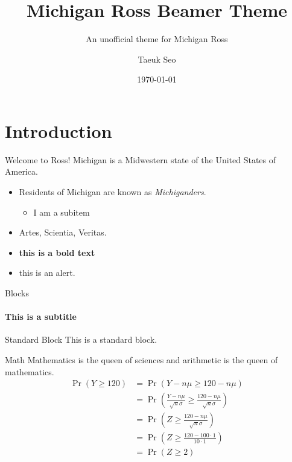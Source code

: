 \documentclass[aspectratio=169]{beamer}
\author{Taeuk Seo}
\title{Michigan Ross Beamer Theme}
\subtitle{An unofficial theme for Michigan Ross}
\institute{Stephen M. Ross School of Business, University of Michigan}
\date{\today}
\begin{document}
\begin{frame}[plain]
	\titlepage
\end{frame}

\section{Introduction}
	
\begin{frame}{Welcome to Ross!}
	Michigan is a Midwestern state of the United States of America. 
	\vfill
	\begin{itemize}
		\item Residents of Michigan are known as \emph{Michiganders}.
		\begin{itemize}
			\item I am a subitem
		\end{itemize}
		\item Artes, Scientia, Veritas.
		\item \textbf{this is a bold text}
		\item \alert{this is an alert}.
	\end{itemize}
\end{frame}

\begin{frame}{Blocks}
	\framesubtitle{This is a subtitle}
	\begin{block}{Standard Block}
		This is a standard block.
	\end{block}
\end{frame}

\begin{frame}{Math}
	Mathematics is the queen of sciences and arithmetic is the queen of mathematics.
	\begin{align*}
		\Pr(Y \geq 120) &= \Pr\left(Y-n\mu \geq 120-n\mu \right)\\
		&= \Pr\left( \frac{Y-n\mu }{\sqrt{n}\sigma} \geq \frac{120-n\mu }{\sqrt{n}\sigma} \right)\\
		&=\Pr\left( Z \geq \frac{120-n\mu }{\sqrt{n}\sigma} \right)\\
		&=\Pr\left( Z \geq \frac{120-100 \cdot 1 }{10 \cdot 1} \right)\\
		&=\Pr\left( Z \geq 2\right)
	\end{align*}
\end{frame}
\end{document}
